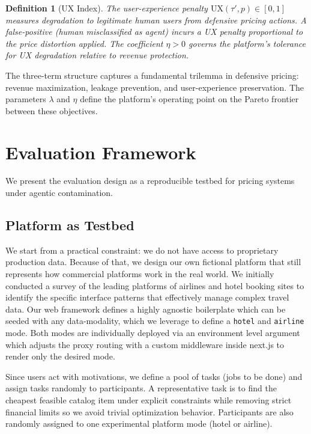 \documentclass[sigconf]{acmart}
\newtheorem{definition}{Definition}
\begin{document}
\begin{definition}[UX Index]
The user-experience penalty $\text{UX}(\tau', p) \in [0, 1]$ measures degradation to legitimate human users from defensive pricing actions. A false-positive (human misclassified as agent) incurs a UX penalty proportional to the price distortion applied. The coefficient $\eta > 0$ governs the platform's tolerance for UX degradation relative to revenue protection.
\end{definition}

The three-term structure captures a fundamental trilemma in defensive pricing: revenue maximization, leakage prevention, and user-experience preservation. The parameters $\lambda$ and $\eta$ define the platform's operating point on the Pareto frontier between these objectives.


\section{Evaluation Framework}

We present the evaluation design as a reproducible testbed for pricing systems under agentic contamination.

\subsection{Platform as Testbed}

We start from a practical constraint: we do not have access to proprietary production data. Because of that, we design our own fictional platform that still represents how commercial platforms work in the real world. We initially conducted a survey of the leading platforms of airlines and hotel booking sites to identify the specific interface patterns that effectively manage complex travel data. Our web framework defines a highly agnostic boilerplate which can be seeded with any data-modality, which we leverage to define a \texttt{hotel} and \texttt{airline} mode. Both modes are individually deployed via an environment level argument which adjusts the proxy routing with a custom middleware inside next.js to render only the desired mode.

Since users act with motivations, we define a pool of tasks (jobs to be done) and assign tasks randomly to participants. A representative task is to find the cheapest feasible catalog item under explicit constraints while removing strict financial limits so we avoid trivial optimization behavior. Participants are also randomly assigned to one experimental platform mode (hotel or airline).
\end{document}
